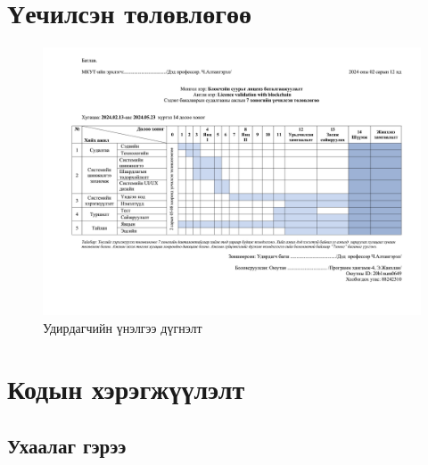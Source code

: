 \appendix
{}

\chapter{Үечилсэн төлөвлөгөө}
\begin{figure}[h!]
   \centering
   \includegraphics[scale=0.065, angle=90]{src/images/periodic-plan.png}
   \caption{Удирдагчийн үнэлгээ дүгнэлт}
\end{figure}


\chapter{Кодын хэрэгжүүлэлт}
\section{Ухаалаг гэрээ}

